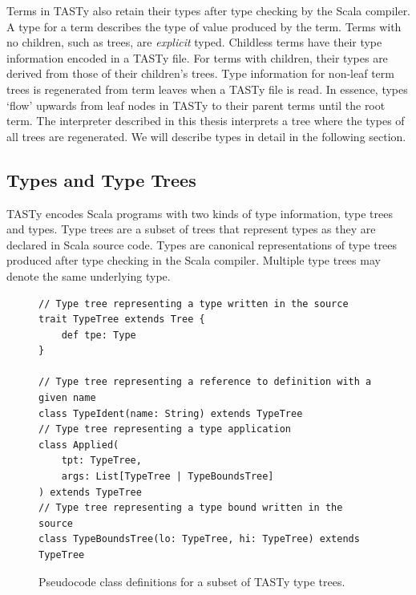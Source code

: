 Terms in TASTy also retain their types after type checking by the Scala compiler.
A type for a term describes the type of value produced by the term.
Terms with no children, such as  trees, are \textit{explicit} typed.
Childless terms have their type information encoded in a TASTy file.  
For terms with children, their types are derived from those of their children's trees.
Type information for non-leaf term trees is regenerated from term leaves when a TASTy file is read.
In essence, types `flow' upwards from leaf nodes in TASTy to their parent terms until the root term.
The interpreter described in this thesis interprets a tree where the types of all trees are regenerated.
We will describe types in detail in the following section.

\subsection{Types and Type Trees}

TASTy encodes Scala programs with two kinds of type information, type trees and types.
Type trees are a subset of trees that represent types as they are declared in Scala source code.
Types are canonical representations of type trees produced after type checking in the Scala compiler.
Multiple type trees may denote the same underlying type.

\begin{figure}[!htb]
\begin{verbatim}
// Type tree representing a type written in the source
trait TypeTree extends Tree {
	def tpe: Type
}

// Type tree representing a reference to definition with a given name
class TypeIdent(name: String) extends TypeTree
// Type tree representing a type application
class Applied(
	tpt: TypeTree, 
	args: List[TypeTree | TypeBoundsTree]
) extends TypeTree
// Type tree representing a type bound written in the source
class TypeBoundsTree(lo: TypeTree, hi: TypeTree) extends TypeTree
\end{verbatim} 
\caption{Pseudocode class definitions for a subset of TASTy type trees.}
\label{tasty:type-trees}
\end{figure}

